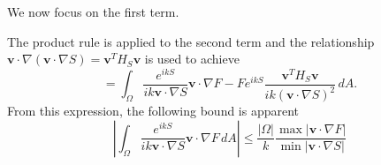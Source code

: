 \documentclass{article}
\newcommand{\abs}[1]{\left\lvert#1\right\rvert}
\theoremstyle{plain}
\begin{document}

We now focus on the first term.



The product rule is applied to the second term and the relationship $\mathbf{v}\cdot\nabla\left(\mathbf{v}\cdot\nabla S\right) = \mathbf{v}^TH_S\mathbf{v}$
is used to achieve
\begin{equation}
    = \int_\Omega \frac{ e^{ikS} }{ {ik\mathbf{v}\cdot\nabla S} } \mathbf{v}\cdot\nabla F
    - Fe^{ikS} \frac{\mathbf{v}^TH_S\mathbf{v}}{ ik\left(\mathbf{v}\cdot\nabla S\right)^2} \,dA.
\end{equation}
From this expression, the following bound is apparent
\begin{equation}
    \abs{ \int_\Omega \frac{ e^{ikS} }{ {ik\mathbf{v}\cdot\nabla S} } \mathbf{v}\cdot\nabla F \,dA }
    \leq \frac{\abs{\Omega}}{k} \frac{\max\abs{\mathbf{v}\cdot\nabla F}}{\min\abs{\mathbf{v}\cdot\nabla S}}
\end{equation}
\end{document}
